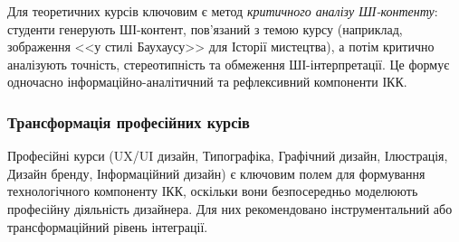 Для теоретичних курсів ключовим є метод \textit{критичного аналізу ШІ-контенту}: студенти генерують ШІ-контент, пов'язаний з темою курсу (наприклад, зображення <<у стилі Баухаусу>> для Історії мистецтва), а потім критично аналізують точність, стереотипність та обмеження ШІ-інтерпретації. Це формує одночасно інформаційно-аналітичний та рефлексивний компоненти ІКК.

\subsubsection{Трансформація професійних курсів}\label{sssec:3.2.5}

Професійні курси (UX/UI дизайн, Типографіка, Графічний дизайн, Ілюстрація, Дизайн бренду, Інформаційний дизайн) є ключовим полем для формування технологічного компоненту ІКК, оскільки вони безпосередньо моделюють професійну діяльність дизайнера. Для них рекомендовано інструментальний або трансформаційний рівень інтеграції.

